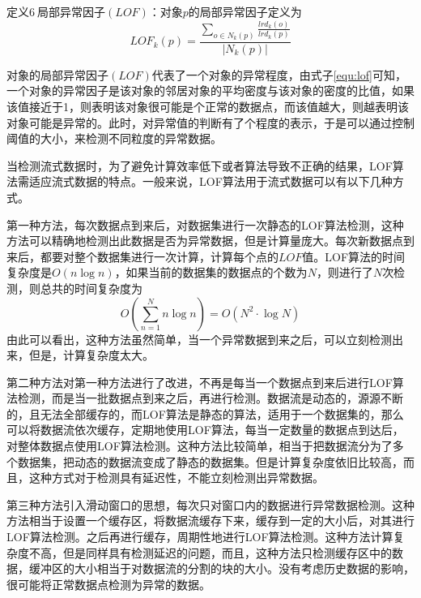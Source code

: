 定义6$\ $局部异常因子$(LOF)$：对象$p$的局部异常因子定义为
\begin{equation}\label{equ:lof}
LOF_{k}\left ( p \right ) = \frac{\sum_{o\in N_{k}\left ( p \right )}\frac{lrd_{k}\left ( o \right )}{lrd_{k}\left ( p \right )}}{\left | N_k\left ( p \right ) \right |}
\end{equation}

对象的局部异常因子$(LOF)$代表了一个对象的异常程度，由式子\ref{equ:lof}可知，一个对象的异常因子是该对象的邻居对象的平均密度与该对象的密度的比值，如果该值接近于1，则表明该对象很可能是个正常的数据点，而该值越大，则越表明该对象可能是异常的。此时，对异常值的判断有了个程度的表示，于是可以通过控制阈值的大小，来检测不同粒度的异常数据。

当检测流式数据时，为了避免计算效率低下或者算法导致不正确的结果，LOF算法需适应流式数据的特点。一般来说，LOF算法用于流式数据可以有以下几种方式。

第一种方法，每次数据点到来后，对数据集进行一次静态的LOF算法检测，这种方法可以精确地检测出此数据是否为异常数据，但是计算量庞大。每次新数据点到来后，都要对整个数据集进行一次计算，计算每个点的$LOF$值。LOF算法的时间复杂度是$O(n\log n)$，如果当前的数据集的数据点的个数为$N$，则进行了$N$次检测，则总共的时间复杂度为
\begin{equation}O\left ( \sum_{n=1}^{N}n\log n \right ) = O\left ( N^{2}\cdot \log N \right )\end{equation}
由此可以看出，这种方法虽然简单，当一个异常数据到来之后，可以立刻检测出来，但是，计算复杂度太大。

第二种方法对第一种方法进行了改进，不再是每当一个数据点到来后进行LOF算法检测，而是当一批数据点到来之后，再进行检测。数据流是动态的，源源不断的，且无法全部缓存的，而LOF算法是静态的算法，适用于一个数据集的，那么可以将数据流依次缓存，定期地使用LOF算法，每当一定数量的数据点到达后，对整体数据点使用LOF算法检测。这种方法比较简单，相当于把数据流分为了多个数据集，把动态的数据流变成了静态的数据集。但是计算复杂度依旧比较高，而且，这种方式对于检测具有延迟性，不能立刻检测出异常数据。

第三种方法引入滑动窗口的思想，每次只对窗口内的数据进行异常数据检测。这种方法相当于设置一个缓存区，将数据流缓存下来，缓存到一定的大小后，对其进行LOF算法检测。之后再进行缓存，周期性地进行LOF算法检测。这种方法计算复杂度不高，但是同样具有检测延迟的问题，而且，这种方法只检测缓存区中的数据，缓冲区的大小相当于对数据流的分割的块的大小。没有考虑历史数据的影响，很可能将正常数据点检测为异常的数据。

